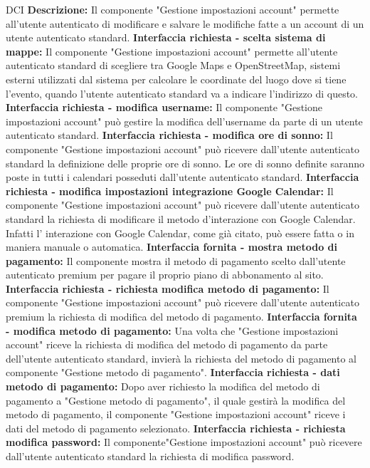 \begin{listaPersonale}{DCI}
    \textbf{Descrizione:} Il componente "Gestione impostazioni account" permette all'utente autenticato di modificare e salvare le modifiche fatte a un account di un utente autenticato standard.
    \textbf{Interfaccia richiesta - scelta sistema di mappe:} Il componente "Gestione impostazioni account" permette all'utente autenticato standard di scegliere tra Google Maps e OpenStreetMap, sistemi esterni utilizzati dal sistema per calcolare le coordinate del luogo dove si tiene l'evento, quando l'utente autenticato standard va a indicare l'indirizzo di questo.
    \textbf{Interfaccia richiesta - modifica username:} Il componente "Gestione impostazioni account" può gestire la modifica dell'username da parte di un utente autenticato standard.
    \textbf{Interfaccia richiesta - modifica ore di sonno:} Il componente "Gestione impostazioni account" può ricevere dall'utente autenticato standard la definizione delle proprie ore di sonno. Le ore di sonno definite saranno poste in tutti i calendari posseduti dall'utente autenticato standard.
    \textbf{Interfaccia richiesta - modifica impostazioni integrazione
        Google Calendar:} Il componente "Gestione impostazioni account" può ricevere dall'utente autenticato standard la richiesta di modificare il metodo d'interazione con Google Calendar. Infatti l' interazione con Google Calendar, come già citato, può essere fatta o in maniera manuale o automatica.
    \textbf{Interfaccia fornita - mostra metodo di pagamento:} Il componente mostra il metodo di pagamento scelto dall'utente autenticato premium per pagare il proprio piano di abbonamento al sito. \\
    \textbf{Interfaccia richiesta - richiesta modifica metodo di
        pagamento:} Il componente "Gestione impostazioni account" può ricevere dall'utente autenticato premium la richiesta di modifica del metodo di pagamento.
    \textbf{Interfaccia fornita - modifica metodo di pagamento:} Una volta che "Gestione impostazioni account" riceve la richiesta di modifica del metodo di pagamento da parte dell'utente autenticato standard, invierà la richiesta del metodo di pagamento al componente "Gestione metodo di pagamento".
    \textbf{Interfaccia richiesta - dati metodo di pagamento:} Dopo aver richiesto la modifica del metodo di pagamento a "Gestione metodo di pagamento", il quale gestirà la modifica del metodo di pagamento, il componente "Gestione impostazioni account" riceve i dati del metodo di pagamento selezionato.
    \textbf{Interfaccia richiesta - richiesta modifica password:} Il componente"Gestione impostazioni account" può ricevere dall'utente autenticato standard la richiesta di modifica password.

\end{listaPersonale}

